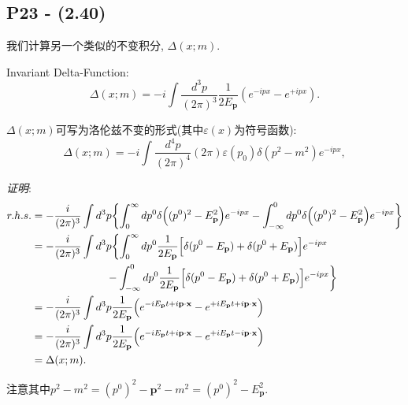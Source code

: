 \subsection{P23 - (2.40)} \label{subsubsec: Invar_Delta}

我们计算另一个类似的不变积分, $\Delta(x; m)$.

Invariant Delta-Function:
\begin{equation}
  \Delta(x; m) = -i\int\frac{d^3 p}{(2\pi)^3} \frac{1}{2E_\mathbf{p}}(e^{-ipx} - e^{+ipx}).
\end{equation}


$\Delta(x; m)$可写为洛伦兹不变的形式(其中$\varepsilon(x)$为符号函数):
\begin{equation}
  \Delta(x; m) = -i\int \frac{d^4 p}{(2\pi)^4}(2\pi)\varepsilon(p_0) \delta(p^2 - m^2)e^{-ipx},
\end{equation}

\textit{证明}:
\begin{equation}
  \begin{aligned}
    r. h. s. & = -\frac{i}{(2\pi)^3}\int d^3 p \biggl\{ \int_{0}^{\infty}dp^0\delta\Bigl((p^0)^2 - E_\mathbf{p}^2\Bigr)e^{-ipx} - \int_{-\infty}^{0}dp^0\delta\Bigl((p^0)^2 - E_\mathbf{p}^2\Bigr)e^{-ipx} \biggr\} \\
             & = -\frac{i}{(2\pi)^3}\int d^3 p \biggl\{ \int_{0}^{\infty}dp^0\frac{1}{2E_\mathbf{p}}\Bigl[\delta(p^0 - E_\mathbf{p}) + \delta(p^0 + E_\mathbf{p}) \Bigr]e^{-ipx}                                    \\
             & \qquad \qquad \qquad \quad -
    \int_{-\infty}^{0}dp^0\frac{1}{2E_\mathbf{p}}\Bigl[\delta(p^0 - E_\mathbf{p}) + \delta(p^0 + E_\mathbf{p}) \Bigr]e^{-ipx}\biggr\}                                                                               \\
             & = -\frac{i}{(2\pi)^3} \int d^3 p \frac{1}{2E_\mathbf{p}} \Bigl(e^{-iE_\mathbf{p} t + i \mathbf{p} \cdot \mathbf{x}} - e^{+iE_\mathbf{p} t + i \mathbf{p} \cdot \mathbf{x}}\Bigr)                     \\
             & = -\frac{i}{(2\pi)^3} \int d^3 p \frac{1}{2E_\mathbf{p}} \Bigl(e^{-iE_\mathbf{p} t + i \mathbf{p} \cdot \mathbf{x}} - e^{+iE_\mathbf{p} t - i \mathbf{p} \cdot \mathbf{x}}\Bigr)                     \\
             & = \Delta(x; m).
  \end{aligned}
\end{equation}

注意其中$p^2 - m^2 = (p^0)^2 - \mathbf{p}^2 - m^2 = (p^0)^2 - E_\mathbf{p}^2$.


